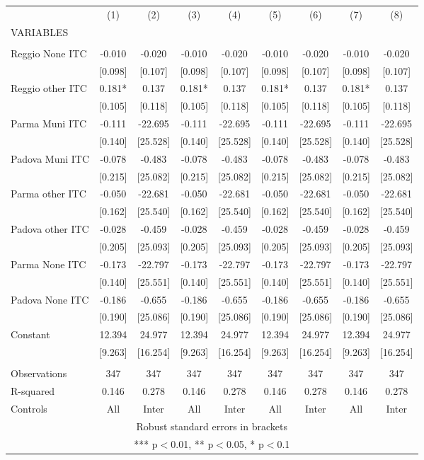 \begin{tabular}{lcccccccc} \hline
 & (1) & (2) & (3) & (4) & (5) & (6) & (7) & (8) \\
VARIABLES &  &  &  &  &  &  &  &  \\ \hline
 &  &  &  &  &  &  &  &  \\
Reggio None ITC & -0.010 & -0.020 & -0.010 & -0.020 & -0.010 & -0.020 & -0.010 & -0.020 \\
 & [0.098] & [0.107] & [0.098] & [0.107] & [0.098] & [0.107] & [0.098] & [0.107] \\
Reggio other ITC & 0.181* & 0.137 & 0.181* & 0.137 & 0.181* & 0.137 & 0.181* & 0.137 \\
 & [0.105] & [0.118] & [0.105] & [0.118] & [0.105] & [0.118] & [0.105] & [0.118] \\
Parma Muni ITC & -0.111 & -22.695 & -0.111 & -22.695 & -0.111 & -22.695 & -0.111 & -22.695 \\
 & [0.140] & [25.528] & [0.140] & [25.528] & [0.140] & [25.528] & [0.140] & [25.528] \\
Padova Muni ITC & -0.078 & -0.483 & -0.078 & -0.483 & -0.078 & -0.483 & -0.078 & -0.483 \\
 & [0.215] & [25.082] & [0.215] & [25.082] & [0.215] & [25.082] & [0.215] & [25.082] \\
Parma other ITC & -0.050 & -22.681 & -0.050 & -22.681 & -0.050 & -22.681 & -0.050 & -22.681 \\
 & [0.162] & [25.540] & [0.162] & [25.540] & [0.162] & [25.540] & [0.162] & [25.540] \\
Padova other ITC & -0.028 & -0.459 & -0.028 & -0.459 & -0.028 & -0.459 & -0.028 & -0.459 \\
 & [0.205] & [25.093] & [0.205] & [25.093] & [0.205] & [25.093] & [0.205] & [25.093] \\
Parma None ITC & -0.173 & -22.797 & -0.173 & -22.797 & -0.173 & -22.797 & -0.173 & -22.797 \\
 & [0.140] & [25.551] & [0.140] & [25.551] & [0.140] & [25.551] & [0.140] & [25.551] \\
Padova None ITC & -0.186 & -0.655 & -0.186 & -0.655 & -0.186 & -0.655 & -0.186 & -0.655 \\
 & [0.190] & [25.086] & [0.190] & [25.086] & [0.190] & [25.086] & [0.190] & [25.086] \\
Constant & 12.394 & 24.977 & 12.394 & 24.977 & 12.394 & 24.977 & 12.394 & 24.977 \\
 & [9.263] & [16.254] & [9.263] & [16.254] & [9.263] & [16.254] & [9.263] & [16.254] \\
 &  &  &  &  &  &  &  &  \\
Observations & 347 & 347 & 347 & 347 & 347 & 347 & 347 & 347 \\
R-squared & 0.146 & 0.278 & 0.146 & 0.278 & 0.146 & 0.278 & 0.146 & 0.278 \\
 Controls & All & Inter & All & Inter & All & Inter & All & Inter \\ \hline
\multicolumn{9}{c}{ Robust standard errors in brackets} \\
\multicolumn{9}{c}{ *** p$<$0.01, ** p$<$0.05, * p$<$0.1} \\
\end{tabular}
